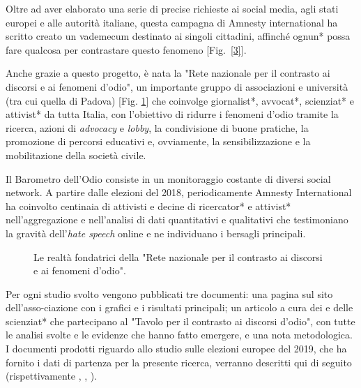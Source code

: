 Oltre ad aver elaborato una serie di precise richieste ai social media, agli stati europei e alle autorità italiane, questa campagna di Amnesty international ha scritto creato un vademecum destinato ai singoli cittadini, affinché ognun* possa fare qualcosa per contrastare questo fenomeno [Fig.~\ref{3}]. 

Anche grazie a questo progetto, è nata la "Rete nazionale per il contrasto ai discorsi e ai fenomeni d’odio", un importante gruppo di associazioni e università (tra cui quella di Padova) [Fig. \ref{fig:rete}] che coinvolge giornalist*, avvocat*, scienziat* e attivist* da tutta Italia, con l'obiettivo di ridurre i fenomeni d'odio tramite la ricerca, azioni di \textit{advocacy} e \textit{lobby}, la condivisione di buone pratiche, la promozione di percorsi educativi e, ovviamente, la sensibilizzazione e la mobilitazione della società civile.

Il Barometro dell'Odio consiste in un monitoraggio costante di diversi social network. A partire dalle elezioni del 2018, periodicamente Amnesty International ha coinvolto centinaia di attivisti e decine di ricercator* e attivist* nell’aggregazione e nell'analisi di dati quantitativi e qualitativi che testimoniano la gravità dell’\textit{hate speech} online e ne individuano i bersagli principali.
\begin{figure}
	\caption{Le realtà fondatrici della "Rete nazionale per il contrasto ai discorsi e ai fenomeni d’odio".}
	\label{fig:rete}
\end{figure}

Per ogni studio svolto vengono pubblicati tre documenti: una pagina sul sito dell'asso-ciazione con i grafici e i risultati principali; un articolo a cura dei e delle scienziat* che partecipano al "Tavolo per il contrasto ai discorsi d’odio", con tutte le analisi svolte e le evidenze che hanno fatto emergere, e una nota metodologica. I documenti prodotti riguardo allo studio sulle elezioni europee del 2019, che ha fornito i dati di partenza per la presente ricerca, verranno descritti qui di seguito (rispettivamente \citep{sito}, \citep{rapporto}, \citep{nota}).


